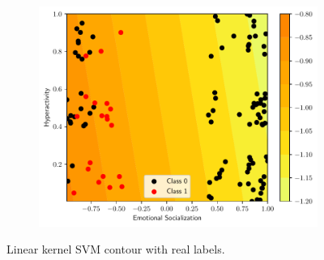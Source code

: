 \documentclass[conference]{IEEEtran}
\theoremstyle{definition}
\theoremstyle{remark}
\theoremstyle{remark}
\begin{document}
\begin{figure}
\begin{subfigure}[b]{0.32\textwidth}
        \includegraphics[width=\textwidth]{figs/svm-linear-contour-2-5.pdf}
        \caption{}
    \end{subfigure}
    \caption{Linear kernel SVM contour with real labels.}
    \label{fig:SVM-linear}
\end{figure}
\end{document}
